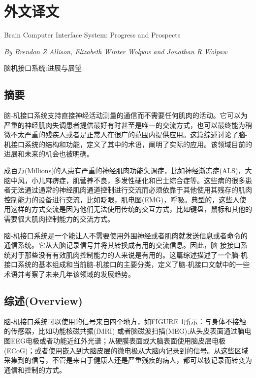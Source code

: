 \chapter*{外\quad 文\quad 译\quad 文}
\pagestyle{empty}

\begin{center}
{\heiti{}Brain Computer Interface System: Progress and Prospects

\textsl{By Brendan Z Allison, Elizabeth Winter Wolpaw and Jonathan R Wolpaw}

\heiti 脑机接口系统:进展与展望
}
\end{center}


\section*{摘要}
脑-机接口系统支持直接神经活动测量的通信而不需要任何肌肉的活动。它可以为严重的神经肌肉失调患者提供最好有时甚至是唯一的交流方式，也可以最终能为稍微不太严重的残疾人或者是正常人在很广的范围内提供应用。这篇综述讨论了脑-机接口系统的结构和功能，定义了其中的术语，阐明了实际的应用。该领域目前的进展和未来的机会也被明确。


成百万(Millions)的人患有严重的神经肌肉功能失调症，比如神经渐冻症(ALS)，大脑中风，小儿麻痹症，肌营养不良，多发性硬化和巴士综合症等。这些病的很多患者无法通过通常的神经肌肉通道控制进行交流而必须依靠于其他使用其残存的肌肉控制能力的设备进行交流，比如眨眼，肌电图(EMG)，呼吸。典型的，这些人使用这样的方式交流是因为他们无法使用传统的交互方式，比如键盘，鼠标和其他的需要很大肌肉控制能力的交流方式。
	
脑-机接口系统是一个能让人不需要使用外围神经或者肌肉就发送信息或者命令的通信系统。它从大脑记录信号并将其转换成有用的交流信息。因此，脑-接接口系统对于那些没有有效肌肉控制能力的人来说是有用的。这篇综述描述了一个脑-机接口系统的基本组成和当前脑-机接口的主要分类，定义了脑-机接口文献中的一些术语并考察了未来几年该领域的发展趋势。

\section*{综述(Overview)}
脑-机接口系统可以使用的信号来自四个地方，如FIGURE 1所示：与身体不接触的传感器，比如功能核磁共振(fMRI) 或者脑磁波扫描(MEG);从头皮表面通过脑电图EEG电极或者功能近红外光谱；从硬膜表面或大脑表面使用脑皮层电极(ECoG)；或者使用嵌入到大脑皮层的微电极从大脑内记录到的信号。从这些区域采集到的信号，不管是来自于健康人还是严重残疾的病人，都可以被记录而转变为通信和控制的方式。

